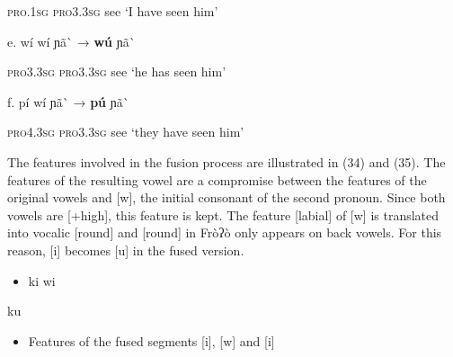 \begin{styleindexi}
              \textsc{pro.1sg}        \textsc{pro3.3sg}      see                               ‘I have seen him’
\end{styleindexi}

\begin{styleindexi}
          e.   wí              wí                ɲã\`{}                 →            \textbf{wú}  ɲã\`{} 
\end{styleindexi}

\begin{styleindexi}
              \textsc{pro3.3sg}     \textsc{pro3.3sg}      see                             ‘he has seen him’
\end{styleindexi}

\begin{styleindexi}
          f.     pí              wí                ɲã\`{}                 →            \textbf{pú}    ɲã\`{}  
\end{styleindexi}

\begin{styleindexi}
              \textsc{pro4.3sg}    \textsc{pro3.3sg}      see                             ‘they have seen him’
\end{styleindexi}

The features involved in the fusion process are illustrated in (34) and (35). The features of the resulting vowel are a compromise between the features of the original vowels and [w], the initial consonant of the second pronoun. Since both vowels are [+high], this feature is kept. The feature [labial] of [w] is translated into vocalic [round] and [round] in Fròʔò only appears on back vowels. For this reason, [i] becomes [u] in the fused version.

\begin{itemize}
\item \begin{styleindexi}
     \label{bkm:Ref486416788}ki                wi
\end{styleindexi}\end{itemize}

  

ku          

\begin{itemize}
\item \begin{styleindexi}
    \label{bkm:Ref359907782}Features of the fused segments [i], [w] and [i]
\end{styleindexi}\end{itemize}
\begin{styleindexi}
          [i]                  [w]                   [i]                    
\end{styleindexi}


